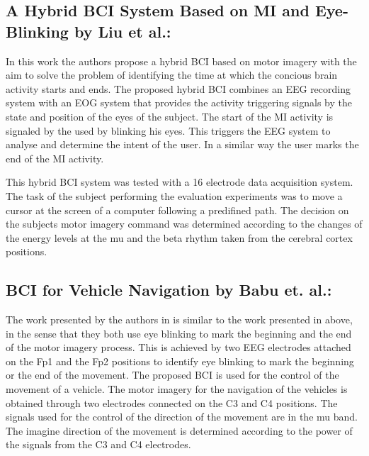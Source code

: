 \subsection{\bf{A Hybrid BCI System Based on MI and Eye-Blinking by Liu et al.:} }
In this work \citep{Liu2018} the authors propose a hybrid BCI based on motor imagery with the aim to solve the problem of identifying the time at which the concious brain activity starts and ends. The proposed hybrid BCI combines an EEG recording system with an EOG system that provides the activity triggering signals by the state and position of the eyes of the subject. The start of the MI activity is signaled by the used by blinking his eyes. This triggers the EEG system to analyse and determine the intent of the user. In a similar way the user marks the end of the MI activity. 

This hybrid BCI system was tested with a 16 electrode data acquisition system. The task of the subject performing the evaluation experiments was to move a cursor at the screen of a computer following a predifined path. The decision on the subjects motor imagery command was determined according to the changes of the energy levels at the mu and the beta rhythm taken from the cerebral cortex positions.   


\subsection{\bf{BCI for Vehicle Navigation by Babu et. al.:}}
The work presented by the authors in \citep{Babu2017} is similar to the work presented in \citep{Liu2018} above, in the sense that they both use eye blinking to mark the beginning and the end of the motor imagery process. This is achieved by two EEG electrodes attached on the Fp1 and the Fp2 positions to identify eye blinking to mark the beginning or the end of the movement. The proposed BCI is used for the control of the movement of a vehicle. The motor imagery for the navigation of the vehicles is obtained through two electrodes connected on the C3 and C4 positions. The signals used for the control of the direction of the movement are in the mu band. The imagine direction of the movement is determined according to the power of the signals from the C3 and C4 electrodes.
